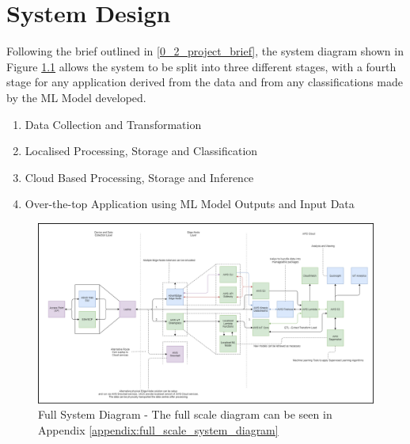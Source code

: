 \chapter{System Design} \label{Chapter:System Design}
Following the brief outlined in \ref{0_2_project_brief}, the system diagram shown in Figure \ref{fig_system_diagram_full} allows the system to be split into three different stages, with a fourth stage for any application derived from the data and from any classifications made by the ML Model developed. 
\begin{enumerate}
    \item Data Collection and Transformation
    \item Localised Processing, Storage and Classification
    \item Cloud Based Processing, Storage and Inference
    \item Over-the-top Application using ML Model Outputs and Input Data
\end{enumerate}



\begin{figure}[ht]
    \label{fig_system_diagram_full}
    \centering
    \includegraphics[width=1\linewidth]{pages/Chapter3/Chapter 3 images/block_system_diagram_v2.png}
    \caption{Full System Diagram - The full scale diagram can be seen in Appendix \ref{appendix:full_scale_system_diagram}}
\end{figure}

